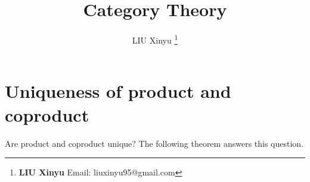 \documentclass[UTF8]{article}
\begin{document}
\title{Category Theory}

\author{LIU Xinyu
\thanks{{\bfseries LIU Xinyu} \newline
  Email: liuxinyu95@gmail.com \newline}
  }

\maketitle
\fi


\chapter*{Uniqueness of product and coproduct}

Are product and coproduct unique? The following theorem answers this question.
\end{document}
